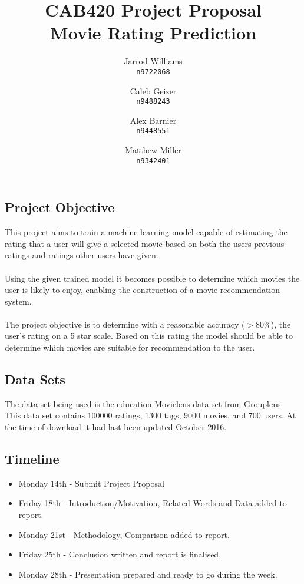 \documentclass[]{report}   %
\begin{document}
\title{CAB420 Project Proposal \\ \large{Movie Rating Prediction}}   %
\author{
	Jarrod Williams\\
	\texttt{n9722068}
	\and 
	Caleb Geizer\\
	\texttt{n9488243}
	\and
	Alex Barnier\\
	\texttt{n9448551}
	\and	
	Matthew Miller\\
	\texttt{n9342401}
}
\maketitle

\subsection*{Project Objective}
This project aims to train a machine learning model capable of estimating the rating that a user will give a selected movie based on both the users previous ratings and ratings other users have given.
\\~\\
Using the given trained model it becomes possible to determine which movies the user is likely to enjoy, enabling the construction of a movie recommendation system.
\\~\\
The project objective is to determine with a reasonable accuracy ($>$80\%), the user's rating on a 5 star scale. Based on this rating the model should be able to determine which movies are suitable for recommendation to the user.
\subsection*{Data Sets}
The data set being used is the education Movielens data set from Grouplens. This data set contains 100000 ratings, 1300 tags, 9000 movies, and 700 users. At the time of download it had last been updated October 2016.

\subsection*{Timeline}
\begin{itemize}
  \item Monday 14th - Submit Project Proposal 
  \item Friday 18th - Introduction/Motivation, Related Words and Data added to report.
  \item Monday 21st - Methodology, Comparison added to report.
  \item Friday 25th - Conclusion written and report is finalised.
  \item Monday 28th - Presentation prepared and ready to go during the week.
\end{itemize}
\end{document}
